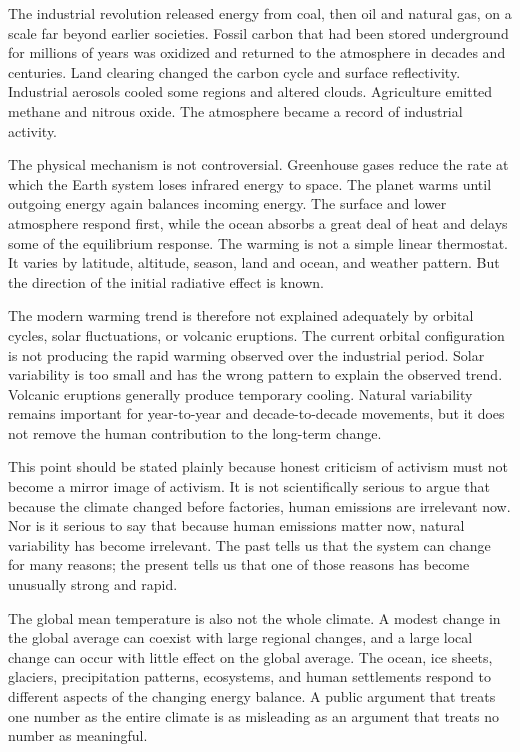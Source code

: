 ﻿\documentclass[12pt,a4paper]{book}
\begin{document}
The industrial revolution released energy from coal, then oil and natural gas, on a scale far beyond earlier societies. Fossil carbon that had been stored underground for millions of years was oxidized and returned to the atmosphere in decades and centuries. Land clearing changed the carbon cycle and surface reflectivity. Industrial aerosols cooled some regions and altered clouds. Agriculture emitted methane and nitrous oxide. The atmosphere became a record of industrial activity.

The physical mechanism is not controversial. Greenhouse gases reduce the rate at which the Earth system loses infrared energy to space. The planet warms until outgoing energy again balances incoming energy. The surface and lower atmosphere respond first, while the ocean absorbs a great deal of heat and delays some of the equilibrium response. The warming is not a simple linear thermostat. It varies by latitude, altitude, season, land and ocean, and weather pattern. But the direction of the initial radiative effect is known.

The modern warming trend is therefore not explained adequately by orbital cycles, solar fluctuations, or volcanic eruptions. The current orbital configuration is not producing the rapid warming observed over the industrial period. Solar variability is too small and has the wrong pattern to explain the observed trend. Volcanic eruptions generally produce temporary cooling. Natural variability remains important for year-to-year and decade-to-decade movements, but it does not remove the human contribution to the long-term change.

This point should be stated plainly because honest criticism of activism must not become a mirror image of activism. It is not scientifically serious to argue that because the climate changed before factories, human emissions are irrelevant now. Nor is it serious to say that because human emissions matter now, natural variability has become irrelevant. The past tells us that the system can change for many reasons; the present tells us that one of those reasons has become unusually strong and rapid.

The global mean temperature is also not the whole climate. A modest change in the global average can coexist with large regional changes, and a large local change can occur with little effect on the global average. The ocean, ice sheets, glaciers, precipitation patterns, ecosystems, and human settlements respond to different aspects of the changing energy balance. A public argument that treats one number as the entire climate is as misleading as an argument that treats no number as meaningful.
\end{document}
